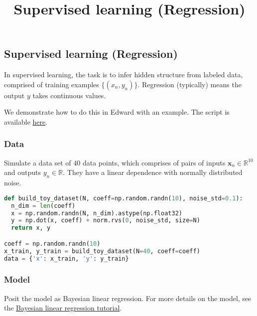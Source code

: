 \title{Supervised learning (Regression)}

\subsection{Supervised learning (Regression)}

In supervised learning, the task is to infer hidden structure from
labeled data, comprised of training examples $\{(x_n, y_n)\}$.
Regression (typically) means the output $y$ takes continuous values.

We demonstrate how to do this in Edward with an example.
The script is available
\href{https://github.com/blei-lab/edward/blob/master/examples/bayesian_linear_regression_test.py}
{here}.


\subsubsection{Data}

Simulate a data set of $40$ data points, which comprises of pairs of inputs $\mathbf{x}_n\in\mathbb{R}^{10}$ and outputs
$y_n\in\mathbb{R}$. They have a linear dependence with normally distributed noise.

\begin{lstlisting}[language=Python]
def build_toy_dataset(N, coeff=np.random.randn(10), noise_std=0.1):
  n_dim = len(coeff)
  x = np.random.randn(N, n_dim).astype(np.float32)
  y = np.dot(x, coeff) + norm.rvs(0, noise_std, size=N)
  return x, y

coeff = np.random.randn(10)
x_train, y_train = build_toy_dataset(N=40, coeff=coeff)
data = {'x': x_train, 'y': y_train}
\end{lstlisting}


\subsubsection{Model}

Posit the model as Bayesian linear regression. For more details on the
model, see the
\href{tut_bayesian_linear_regression}
{Bayesian linear regression tutorial}.

